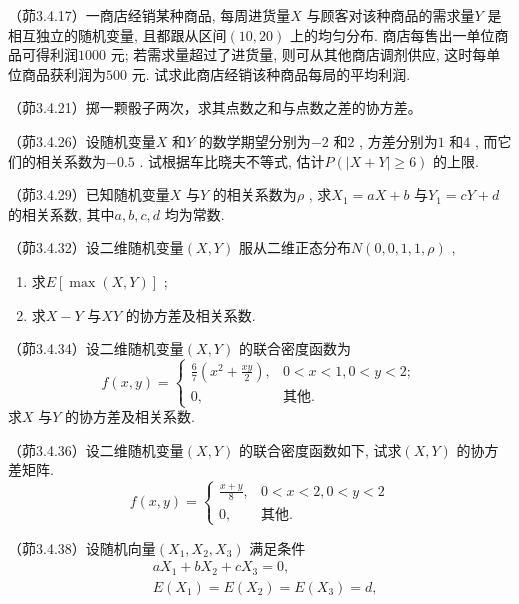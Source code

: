 \begin{problemset}[错题记录]
    \item （茆3.4.17）一商店经销某种商品, 每周进货量$X$ 与顾客对该种商品的需求量$Y$ 是相互独立的随机变量, 且都跟从区间$(10,20)$ 上的均匀分布. 商店每售出一单位商品可得利润$1000$ 元; 若需求量超过了进货量, 则可从其他商店调剂供应, 这时每单位商品获利润为$500$ 元. 试求此商店经销该种商品每局的平均利润.
    \item （茆3.4.21）掷一颗骰子两次，求其点数之和与点数之差的协方差。
    \item （茆3.4.26）设随机变量$X$ 和$Y$ 的数学期望分别为$-2$ 和$2$ , 方差分别为$1$ 和$4$ , 而它们的相关系数为$-0.5$ . 试根据车比晓夫不等式, 估计$P(|X+Y|\geqslant 6)$ 的上限.
    \item （茆3.4.29）已知随机变量$X$ 与$Y$ 的相关系数为$\rho$ , 求$X_1=aX+b$ 与$Y_1=cY+d$ 的相关系数, 其中$a,b,c,d$ 均为常数.
    \item （茆3.4.32）设二维随机变量$(X,Y)$ 服从二维正态分布$N(0,0,1,1,\rho)$ ,
    \begin{enumerate}
        \item 求$E[ \max(X,Y) ]$ ;
        \item 求$X-Y$ 与$XY$ 的协方差及相关系数.
    \end{enumerate}
    \item （茆3.4.34）设二维随机变量$(X,Y)$ 的联合密度函数为
    \begin{equation*}
        f(x,y)=\begin{cases}
            \frac{6}{7}\left( x^2+\frac{xy}{2} \right), & 0<x<1,0<y<2; \\
            0,                                          & \text{其他}.
        \end{cases}
    \end{equation*}
    求$X$ 与$Y$ 的协方差及相关系数.
    \item （茆3.4.36）设二维随机变量$(X,Y)$ 的联合密度函数如下, 试求$(X,Y)$ 的协方差矩阵.\begin{equation*}
        f(x,y)=\begin{cases}
            \frac{x+y}{8}, & 0<x<2,0<y<2  \\
            0,             & \text{其他}.
        \end{cases}
    \end{equation*}
    \item （茆3.4.38）设随机向量$(X_1,X_2,X_3)$ 满足条件
    \begin{align*}
         & aX_1+bX_2+cX_3=0,                       \\
         & E(X_1)=E(X_2)=E(X_3)=d,                 \\

\end{align*}
\end{problemset}
